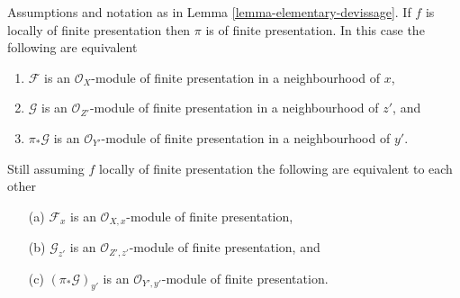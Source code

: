 \begin{lemma}
\label{lemma-devissage-finite-presentation}
Assumptions and notation as in
Lemma \ref{lemma-elementary-devissage}.
If $f$ is locally of finite presentation
then $\pi$ is of finite presentation.
In this case the following are equivalent
\begin{enumerate}
\item $\mathcal{F}$ is an $\mathcal{O}_X$-module of finite presentation
in a neighbourhood of $x$,
\item $\mathcal{G}$ is an $\mathcal{O}_{Z'}$-module of finite presentation
in a neighbourhood of $z'$, and
\item $\pi_*\mathcal{G}$ is an $\mathcal{O}_{Y'}$-module of
finite presentation in a neighbourhood of $y'$.
\end{enumerate}
Still assuming $f$ locally of finite presentation the following are
equivalent to each other
\begin{enumerate}
\item[(a)] $\mathcal{F}_x$ is an $\mathcal{O}_{X, x}$-module of finite
presentation,
\item[(b)] $\mathcal{G}_{z'}$ is an $\mathcal{O}_{Z', z'}$-module of
finite presentation, and
\item[(c)] $(\pi_*\mathcal{G})_{y'}$ is an $\mathcal{O}_{Y', y'}$-module
of finite presentation.
\end{enumerate}
\end{lemma}

